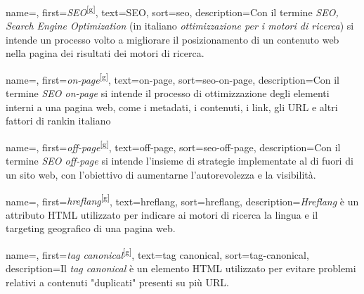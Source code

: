 



 {
    name=,
    first={\textit{SEO}\textsuperscript{[g]}},
    text=SEO,
    sort=seo,
    description={Con il termine \textit{SEO, Search Engine Optimization} (in italiano \textit{ottimizzazione per i motori di ricerca}) si intende un processo volto a migliorare il posizionamento di un contenuto web nella pagina dei risultati dei motori di ricerca.}
}

 {
    name=,
    first={\textit{on-page}\textsuperscript{[g]}},
    text=on-page,
    sort=seo-on-page,
    description={Con il termine \textit{SEO on-page} si intende il processo di ottimizzazione degli elementi interni a una pagina web, come i metadati, i contenuti, i link, gli URL e altri fattori di rankin italiano}
}

 {
    name=,
    first={\textit{off-page}\textsuperscript{[g]}},
    text=off-page,
    sort=seo-off-page,
    description={Con il termine \textit{SEO off-page} si intende l'insieme di strategie implementate al di fuori di un sito web, con l'obiettivo di aumentarne l'autorevolezza e la visibilità.}
}

 {
    name=,
    first={\textit{hreflang}\textsuperscript{[g]}},
    text=hreflang,
    sort=hreflang,
    description={\textit{Hreflang} è un attributo HTML utilizzato per indicare ai motori di ricerca la lingua e il targeting geografico di una pagina web.}
}

 {
    name=,
    first={\textit{tag canonical}\textsuperscript{[g]}},
    text=tag canonical,
    sort=tag-canonical,
    description={Il \textit{tag canonical} è un elemento HTML utilizzato per evitare problemi relativi a contenuti "duplicati" presenti su più URL.}
}

